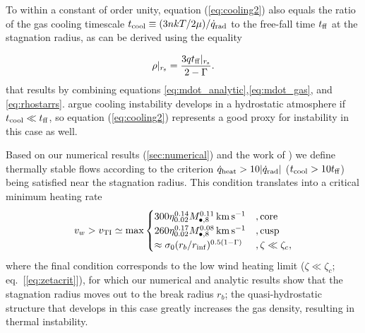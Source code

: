 \documentclass[usenatbib,fleqn]{mn2e}
\newcommand{\tff}{t_{\rm ff}}
\begin{document}
To within a constant of order unity, equation (\ref{eq:cooling2}) also
equals the ratio of the gas cooling timescale $t_{\rm cool} \equiv (3n
kT/2 \mu)/\dot{q}_{\rm rad}$ to the free-fall time $t_{\rm ff}$ at the
stagnation radius, as can be derived using the equality

\begin{align}
\rho|_{r_{\rm s}}=\frac{3 q\tff|_{r_{\rm s}}}{2-\Gamma}.
\label{eq:rhors2}
\end{align}
that results by combining equations
\eqref{eq:mdot_analytic},\eqref{eq:mdot_gas}, and
\eqref{eq:rhostarrs}.  \citet{McCourt+12} argue cooling instability
develops in a hydrostatic atmosphere if $t_{\rm cool} \ll t_{\rm ff}$,
so equation (\ref{eq:cooling2}) represents a good proxy for
instability in this case as well.

Based on our numerical results (\ref{sec:numerical}) and the work of \citet{McCourt+12}) we define thermally stable flows according to the criterion $\dot{q}_{\rm heat} > 10|\dot{q}_{\rm rad}|$ ($t_{\rm
  cool} > 10t_{\rm ff}$) being satisfied near the stagnation radius.  This condition translates into a
critical minimum heating rate
\begin{align}
v_{w} > v_{\rm TI} \simeq
  {\rm max}\begin{cases}
   300 \eta_{0.02}^{0.14} M_{\bullet,8}^{0.11}\,{\rm km\,s^{-1}}  &, \text{core}\\
   260 \eta_{0.02}^{0.17} M_{\bullet,8}^{0.08}\,{\rm km\,s^{-1}}   &, \text{cusp}  \\
\approx \sigma_0(r_{b}/r_{\rm inf})^{0.5(1-\Gamma)} &, \zeta \ll \zeta_c, 
  \end{cases}
  \label{eq:cooling3}
\end{align}
where the final condition corresponds to the low wind heating limit
($\zeta \ll \zeta_c$; eq.~[\ref{eq:zetacrit}]), for which our
numerical and analytic results show that the stagnation radius moves
out to the break radius $r_b$; the quasi-hydrostatic structure that
develops in this case greatly increases the gas density, resulting in
thermal instability.
\end{document}
